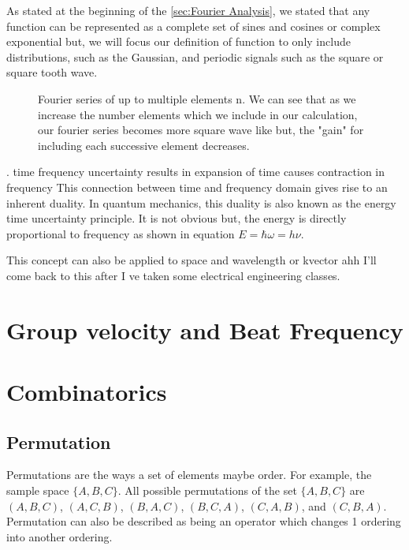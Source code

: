 \documentclass[11pt,a4paper]{book}
\newcommand{\imginput}[1]{} %
\begin{document}
			As stated at the beginning of the \autoref{sec:Fourier Analysis}, we stated that any function can be represented as a complete set of sines and cosines or complex exponential but, we will focus our definition of function to only include distributions, such as the Gaussian, and periodic signals such as the square or square tooth wave. 
			
			\begin{figure} [!ht]
				\centering
				\def\svgwidth{\columnwidth}
				\resizebox{16cm}{!}{\imginput{images/fourier-series-squarewave.pdf_tex}}
				\label{fig:fourier-series-squarewave}
				\caption{Fourier series of up to multiple elements n. We can see that as we increase the number elements which we include in our calculation, our fourier series becomes more square wave like but, the "gain" for including each successive element  decreases.}
			\end{figure}	
			
			. time frequency uncertainty
			results in
			expansion of time causes contraction in frequency
			This connection between time and frequency domain gives rise to an inherent duality. In quantum mechanics, this duality is also known as the energy time uncertainty principle. It is not obvious but, the energy is directly proportional to frequency as shown in equation $E=\hbar\omega=h\nu$. 
			
			This concept can also be applied to space and wavelength or kvector 
			ahh I'll come back to this after I ve taken some electrical engineering classes.
	\section{Group velocity and Beat Frequency}
	
	\section{Combinatorics}
		\label{sec:Combinatorics}
		
		
		
		\subsection{Permutation}
			\label{subsec:Permutation}
			Permutations are the ways a set of elements maybe order. For example, the sample space $\{A,B,C\}$. All possible permutations of the set $\{A,B,C\}$ are
			$\left(A,B,C\right)$, $\left(A,C,B\right)$, $\left(B,A,C\right)$, $\left(B,C,A\right)$, $\left(C,A,B\right)$, and 
			$\left(C,B,A\right)$. Permutation can also be described as being an operator which changes 1 ordering into another ordering.
			
\end{document}
